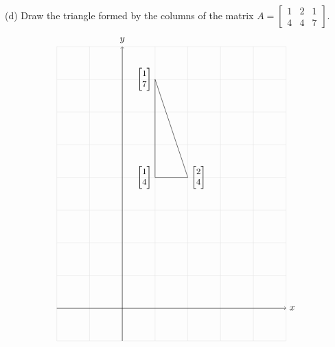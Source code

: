 (d) Draw the triangle formed by the columns of the matrix $A = \begin{bmatrix}
    1 & 2 & 1\\4 & 4 & 7
\end{bmatrix}$.
\begin{gather*}
    \begin{tikzpicture} [scale = 1.2]
        \coordinate (O) at (0,0);
        \draw[thin,gray!20] (-2, -1) grid (5,8);
        \draw[->] (-2,0)--(5,0) node[right]{$x$};
        \draw[->] (0,-1)--(0,8) node[above]{$y$};
        \draw (1,4) node[anchor=east]{$\small\begin{bmatrix}1\\4\end{bmatrix}$}
        -- (2,4) node[anchor=west]{$\small\begin{bmatrix}2\\4\end{bmatrix}$}
        -- (1,7) node[anchor=east]{$\small\begin{bmatrix}1\\7\end{bmatrix}$}
            -- cycle;
    \end{tikzpicture}
\end{gather*}

